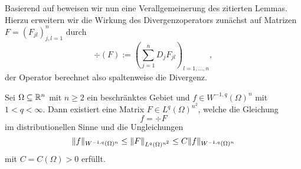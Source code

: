 Basierend auf \cite[S.61, Lemma 1.6.1]{sohr2001navier} beweisen wir nun eine Verallgemeinerung des zitierten Lemmas. 
Hierzu erweitern wir die Wirkung des Divergenzoperators zunächst auf Matrizen $F = (F_{jl})_{j,l=1}^n$ durch
\begin{equation}
  \label{eq:divMatrix}
  \div(F) := (\sum_{j = 1}^n D_j F_{jl})_{l = 1,\dots,n},
\end{equation}
der Operator berechnet also spaltenweise die Divergenz.

\begin{lem}
  \label{lem:divRepresentation}
  Sei $\Omega \subseteq \mathbb{R}^n$ mit $n \geq 2$ ein beschränktes Gebiet und $f \in W^{-1,q}(\Omega)^n$ mit $1 < q < \infty$.
  Dann existiert eine Matrix $F \in L^q(\Omega)^{n^2}$, welche die Gleichung
  $$ f = \div F $$
  im distributionellen Sinne und die Ungleichungen
  $$
  \lVert  f  \rVert_{W^{-1,q}(\Omega)^n} 
  \leq \lVert  F  \rVert_{L^q(\Omega)^{n^2}} 
  \leq C \lVert  f  \rVert_{W^{-1,q}(\Omega)^n}
  $$
  mit $C = C(\Omega) > 0$ erfüllt.
\end{lem}

